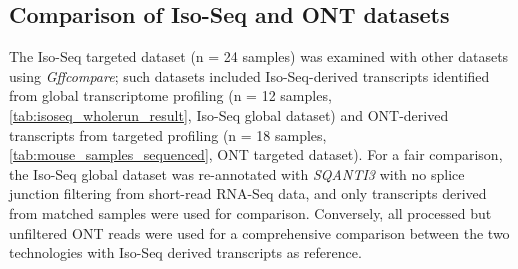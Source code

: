 \subsection{Comparison of Iso-Seq and ONT datasets}
The Iso-Seq targeted dataset (n = 24 samples) was examined with other datasets using \textit{Gffcompare}; such datasets included Iso-Seq-derived transcripts identified from global transcriptome profiling (n = 12 samples, \cref{tab:isoseq_wholerun_result}, Iso-Seq global dataset) and ONT-derived transcripts from targeted profiling (n = 18 samples, \cref{tab:mouse_samples_sequenced}, ONT targeted dataset). For a fair comparison, the Iso-Seq global dataset was re-annotated with \textit{SQANTI3} with no splice junction filtering from short-read RNA-Seq data, and only transcripts derived from matched samples were used for comparison. Conversely, all processed but unfiltered ONT reads were used for a comprehensive comparison between the two technologies with Iso-Seq derived transcripts as reference. 

